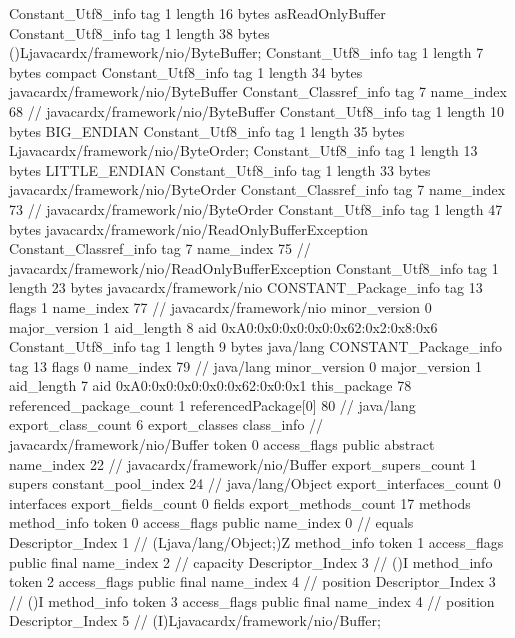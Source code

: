 {{{		}
		Constant_Utf8_info {
			tag	1
			length	16
			bytes	asReadOnlyBuffer
		}
		Constant_Utf8_info {
			tag	1
			length	38
			bytes	()Ljavacardx/framework/nio/ByteBuffer;
		}
		Constant_Utf8_info {
			tag	1
			length	7
			bytes	compact
		}
		Constant_Utf8_info {
			tag	1
			length	34
			bytes	javacardx/framework/nio/ByteBuffer
		}
		Constant_Classref_info {
			tag	7
			name_index	68		// javacardx/framework/nio/ByteBuffer
		}
		Constant_Utf8_info {
			tag	1
			length	10
			bytes	BIG_ENDIAN
		}
		Constant_Utf8_info {
			tag	1
			length	35
			bytes	Ljavacardx/framework/nio/ByteOrder;
		}
		Constant_Utf8_info {
			tag	1
			length	13
			bytes	LITTLE_ENDIAN
		}
		Constant_Utf8_info {
			tag	1
			length	33
			bytes	javacardx/framework/nio/ByteOrder
		}
		Constant_Classref_info {
			tag	7
			name_index	73		// javacardx/framework/nio/ByteOrder
		}
		Constant_Utf8_info {
			tag	1
			length	47
			bytes	javacardx/framework/nio/ReadOnlyBufferException
		}
		Constant_Classref_info {
			tag	7
			name_index	75		// javacardx/framework/nio/ReadOnlyBufferException
		}
		Constant_Utf8_info {
			tag	1
			length	23
			bytes	javacardx/framework/nio
		}
		CONSTANT_Package_info {
			tag	13
			flags	1
			name_index	77		// javacardx/framework/nio
			minor_version	0
			major_version	1
			aid_length	8
			aid	0xA0:0x0:0x0:0x0:0x62:0x2:0x8:0x6
		}
		Constant_Utf8_info {
			tag	1
			length	9
			bytes	java/lang
		}
		CONSTANT_Package_info {
			tag	13
			flags	0
			name_index	79		// java/lang
			minor_version	0
			major_version	1
			aid_length	7
			aid	0xA0:0x0:0x0:0x0:0x62:0x0:0x1
		}
	}
	this_package	78
	referenced_package_count	1
	referencedPackage[0]	80		// java/lang
	export_class_count	6
	export_classes {
		class_info {		// javacardx/framework/nio/Buffer
			token	0
			access_flags	public abstract
			name_index	22		// javacardx/framework/nio/Buffer
			export_supers_count	1
			supers {
				constant_pool_index	24		// java/lang/Object
			}
			export_interfaces_count	0
			interfaces {
			}
			export_fields_count	0
			fields {
			}
			export_methods_count	17
			methods {
				method_info {
					token	0
					access_flags	public
					name_index	0		// equals
					Descriptor_Index	1		// (Ljava/lang/Object;)Z
				}
				method_info {
					token	1
					access_flags	public final
					name_index	2		// capacity
					Descriptor_Index	3		// ()I
				}
				method_info {
					token	2
					access_flags	public final
					name_index	4		// position
					Descriptor_Index	3		// ()I
				}
				method_info {
					token	3
					access_flags	public final
					name_index	4		// position
					Descriptor_Index	5		// (I)Ljavacardx/framework/nio/Buffer;
}}}}}
